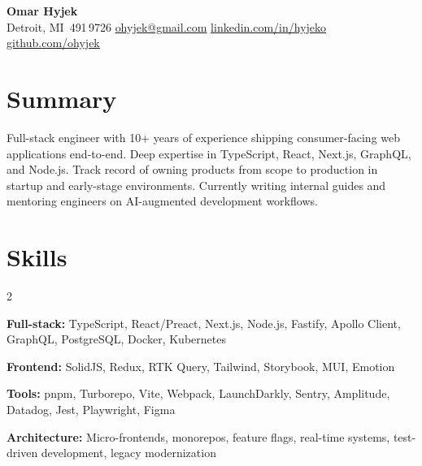 \documentclass[11pt,letterpaper]{article}
\begin{document}
\begin{center}
  {\Large\bfseries Omar Hyjek} \\[2pt]
  {\footnotesize\color{light}
    \enspace Detroit, MI \enspace\textbar\enspace
    \,491\,9726 \enspace\textbar\enspace
    \enspace \href{mailto:ohyjek@gmail.com}{ohyjek@gmail.com} \enspace\textbar\enspace
    \faLinkedin\enspace \href{https://www.linkedin.com/in/hyjeko}{linkedin.com/in/hyjeko} \enspace\textbar\enspace
    \faGithub\enspace \href{https://github.com/ohyjek}{github.com/ohyjek}
  }
\end{center}

\vspace{-4pt}

\section*{Summary}
{\small Full-stack engineer with 10+ years of experience shipping consumer-facing web applications end-to-end. Deep expertise in TypeScript, React, Next.js, GraphQL, and Node.js. Track record of owning products from scope to production in startup and early-stage environments. Currently writing internal guides and mentoring engineers on AI-augmented development workflows.}

\section*{Skills}
\vspace{-2pt}
\begin{multicols}{2}
{\footnotesize
\textbf{Full-stack:} TypeScript, React/Preact, Next.js, Node.js, Fastify, Apollo Client, GraphQL, PostgreSQL, Docker, Kubernetes

\textbf{Frontend:} SolidJS, Redux, RTK Query, Tailwind, Storybook, MUI, Emotion

\columnbreak

\textbf{Tools:} pnpm, Turborepo, Vite, Webpack, LaunchDarkly, Sentry, Amplitude, Datadog, Jest, Playwright, Figma

\textbf{Architecture:} Micro-frontends, monorepos, feature flags, real-time systems, test-driven development, legacy modernization
}
\end{multicols}

\vspace{-6pt}
\end{document}
